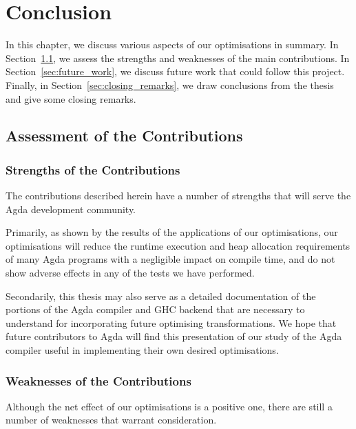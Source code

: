 \chapter{Conclusion}
\label{cha:conclusion}

In this chapter, we discuss various aspects of our optimisations in summary. In Section~\ref{sec:assessment_of_the_contributions}, we assess the strengths and weaknesses of the main contributions. In Section~\ref{sec:future_work}, we discuss future work that could follow this project. Finally, in Section~\ref{sec:closing_remarks}, we draw conclusions from the thesis and give some closing remarks.

\section{Assessment of the Contributions}
\label{sec:assessment_of_the_contributions}

\subsection{Strengths of the Contributions}
\label{sub:strengths_of_the_contributions}

The contributions described herein have a number of strengths that will serve the Agda development community.

Primarily, as shown by the results of the applications of our optimisations, our optimisations will reduce the runtime execution and heap allocation requirements of many Agda programs with a negligible impact on compile time, and do not show adverse effects in any of the tests we have performed.

Secondarily, this thesis may also serve as a detailed documentation of the portions of the Agda compiler and GHC backend that are necessary to understand for incorporating future optimising transformations. We hope that future contributors to Agda will find this presentation of our study of the Agda compiler useful in implementing their own desired optimisations.

\subsection{Weaknesses of the Contributions}
\label{sub:weaknesses_of_the_contributions}

Although the net effect of our optimisations is a positive one, there are still a number of weaknesses that warrant consideration.

